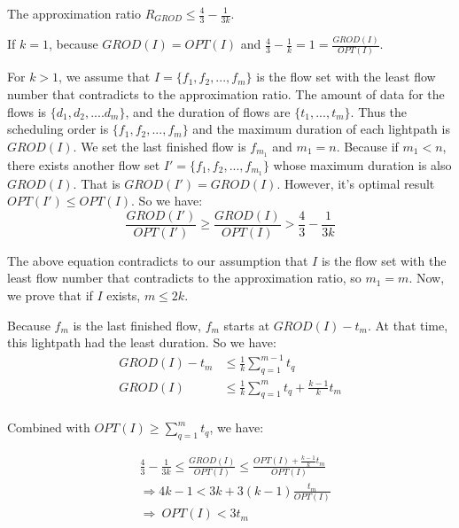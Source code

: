 \begin{theorem}\label{bound:GROD}
The approximation ratio $R_{GROD}\leq\frac{4}{3}-\frac{1}{3k}$.
\end{theorem}
\begin{IEEEproof}
If $k=1$, because $GROD(I)=OPT(I)$ and $\frac{4}{3}-\frac{1}{k}=1=\frac{GROD(I)}{OPT(I)}$.

For $k>1$, we assume that $I=\{f_1,f_2,...,f_m\}$ is the flow set with the least flow number that contradicts to the approximation ratio. The amount of data for the flows is $\{d_1,d_2,....d_m\}$, and the duration of flows are $\{t_1,...,t_m\}$. Thus the scheduling order is $\{f_1,f_2,...,f_m\}$ and the maximum duration of each lightpath is $GROD(I)$. We set the last finished flow is $f_{m_1}$ and $m_1=n$. Because if $m_1<n$, there exists another flow set $I'=\{f_1,f_2,...,f_{m_1}\}$ whose maximum duration is also $GROD(I)$. That is $GROD(I')=GROD(I)$.  However, it's optimal result $OPT(I')\leq OPT(I)$. So we have:
\begin{equation}
\frac{GROD(I')}{OPT(I')}\geq\frac{GROD(I)}{OPT(I)}> \frac{4}{3}-\frac{1}{3k}
\end{equation}

The above equation contradicts to our assumption that $I$ is the flow set with the least flow number that contradicts to the approximation ratio, so $m_1=m$. Now, we prove that if $I$ exists, $m\leq 2k$.

Because $f_m$ is the last finished flow, $f_m$ starts at $GROD(I)-t_m$. At that time, this lightpath had the least duration. So we have:
\begin{equation}
\begin{aligned}
GROD(I)-t_m  &\leq\frac{1}{k}\sum\limits_{q=1}^{m-1}t_q\\
GROD(I) &\leq\frac{1}{k}\sum\limits_{q=1}^{m}t_q+\frac{k-1}{k}t_m\\
\end{aligned}
\end{equation}

Combined with $OPT(I)\geq \sum\limits_{q=1}^{m}t_q$, we have:

\begin{equation}
\begin{aligned}
&\frac{4}{3}-\frac{1}{3k}\leq \frac{GROD(I)}{OPT(I)}\leq\frac{OPT(I)+\frac{k-1}{k}t_m}{OPT(I)}\\%
&\Rightarrow 4k-1<3k+3(k-1)\frac{t_m}{OPT(I)}\\
& \Rightarrow\ OPT(I)<3t_m
\end{aligned}
\end{equation}


\end{IEEEproof}
